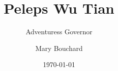 ﻿\documentclass[10pt,twocolumn,twoside]{book}
\title{Peleps Wu Tian}
\subtitle{Adventuress Governor}
\author{Mary Bouchard}
\date{\ddmmmyyyydate\today}
\begin{document}
\frontmatter
{}
\pagestyle{empty}

\begin{titlepage}
    \MakeExaltedTitle
\end{titlepage}

\blankpage

\mainmatter
\pagestyle{main}




\end{document}
